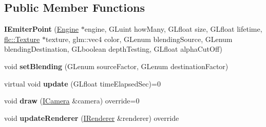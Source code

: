 \subsection*{Public Member Functions}
\begin{DoxyCompactItemize}
\item 
\mbox{\label{classflw_1_1flf_1_1IEmiterPoint_a1f761af10d0b44e2847ea0f2150cdc0e}} 
{\bfseries I\+Emiter\+Point} (\hyperlink{classflw_1_1Engine}{Engine} $\ast$engine, G\+Luint how\+Many, G\+Lfloat size, G\+Lfloat lifetime, \hyperlink{classflw_1_1flc_1_1Texture}{flc\+::\+Texture} $\ast$texture, glm\+::vec4 color, G\+Lenum blending\+Source, G\+Lenum blending\+Destination, G\+Lboolean depth\+Testing, G\+Lfloat alpha\+Cut\+Off)
\item 
\mbox{\label{classflw_1_1flf_1_1IEmiterPoint_ad59e7a2e8b4559a54657638aa7249c8b}} 
void {\bfseries set\+Blending} (G\+Lenum source\+Factor, G\+Lenum destination\+Factor)
\item 
\mbox{\label{classflw_1_1flf_1_1IEmiterPoint_a7bfbe34cfbcf3222ab5e9068aedb3962}} 
virtual void {\bfseries update} (G\+Lfloat time\+Elapsed\+Sec)=0
\item 
\mbox{\label{classflw_1_1flf_1_1IEmiterPoint_aeffded615ab4356617b62556f6f13456}} 
void {\bfseries draw} (\hyperlink{classflw_1_1flf_1_1ICamera}{I\+Camera} \&camera) override=0
\item 
\mbox{\label{classflw_1_1flf_1_1IEmiterPoint_a1945d37be66cb8ef17f3f6d96f146dcc}} 
void {\bfseries update\+Renderer} (\hyperlink{classflw_1_1flf_1_1IRenderer}{I\+Renderer} \&renderer) override
\end{DoxyCompactItemize}

